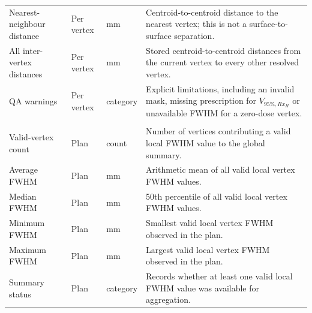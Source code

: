 {\begin{longtable}{
  >{\raggedright\arraybackslash}p{3.0cm}
  >{\centering\arraybackslash}p{1.25cm}
  >{\centering\arraybackslash}p{1.45cm}
  >{\raggedright\arraybackslash}p{9.45cm}}
Nearest-neighbour distance & Per vertex & mm & Centroid-to-centroid distance to the nearest vertex; this is not a surface-to-surface separation. \\
All inter-vertex distances & Per vertex & mm & Stored centroid-to-centroid distances from the current vertex to every other resolved vertex. \\
QA warnings & Per vertex & category & Explicit limitations, including an invalid mask, missing prescription for $V_{95\%,Rx_H}$ or unavailable FWHM for a zero-dose vertex. \\

\addlinespace[4pt]
\multicolumn{4}{l}{\textbf{Global FWHM summary}}\\*
\addlinespace[2pt]
Valid-vertex count & Plan & count & Number of vertices contributing a valid local FWHM value to the global summary. \\
Average FWHM & Plan & mm & Arithmetic mean of all valid local vertex FWHM values. \\
Median FWHM & Plan & mm & 50th percentile of all valid local vertex FWHM values. \\
Minimum FWHM & Plan & mm & Smallest valid local vertex FWHM observed in the plan. \\
Maximum FWHM & Plan & mm & Largest valid local vertex FWHM observed in the plan. \\
Summary status & Plan & category & Records whether at least one valid local FWHM value was available for aggregation. \\


\end{longtable}}
